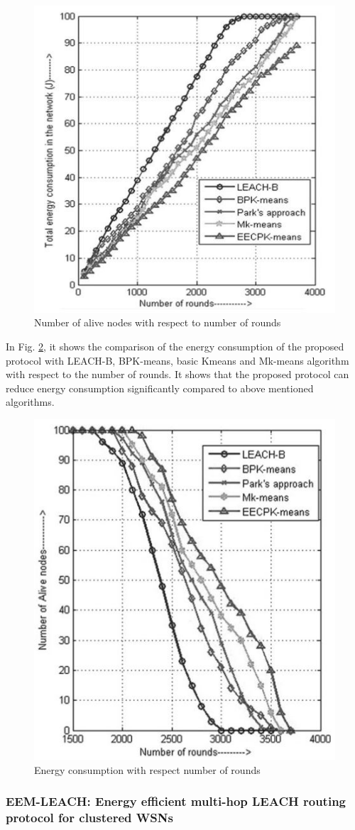 \documentclass[11pt]{report}
\begin{document}
\begin{itemize}
		\begin{figure}[h!]
			\centering
			\includegraphics[width=0.5\linewidth]{5th.jpg}
			\caption{Number of alive nodes with respect to number of rounds}
			\label{fig5}
		\end{figure}
	    In Fig. \ref {fig6}, it shows the comparison of the energy consumption of the proposed protocol with LEACH-B, BPK-means, basic Kmeans and Mk-means algorithm with respect to the number of rounds. It shows that the proposed protocol can reduce energy consumption significantly compared to above mentioned algorithms.
	    \begin{figure}[h!]
	    	\centering
	    	\includegraphics[width=0.5\linewidth]{6th.jpg}
	    	\caption{Energy consumption with respect number of rounds}
	    	\label{fig6}
	    \end{figure}
	\end{itemize}
	\subsubsection{EEM-LEACH: Energy efficient multi-hop LEACH routing protocol for clustered WSNs}
	
\end{document}
